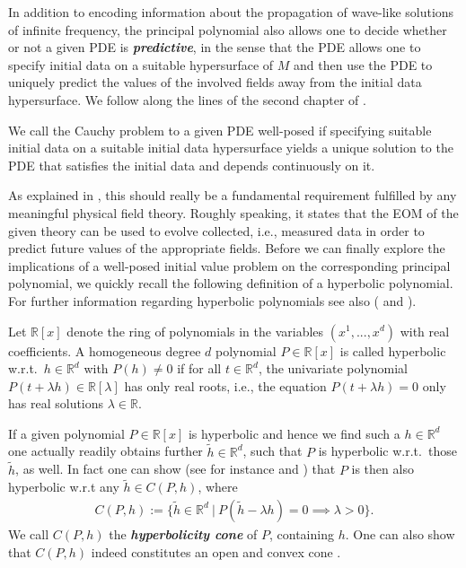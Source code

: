 In addition to encoding information about the propagation of wave-like solutions of infinite frequency, the principal polynomial also allows one to decide whether or not a given PDE is \textit{\textbf{predictive}}, in the sense that the PDE allows one to specify initial data on a suitable hypersurface of $M$ and then use the PDE to uniquely predict the values of the involved fields away from the initial data hypersurface. We follow along the lines of the second chapter of \cite{Rivera}.
\begin{definition}
We call the Cauchy problem to a given PDE well-posed if specifying suitable initial data on a suitable initial data hypersurface yields a unique solution to the PDE that satisfies the initial data and depends continuously on it.  
\end{definition}
As explained in \cite{Rivera}, this should really be a fundamental requirement fulfilled by any meaningful physical field theory. Roughly speaking, it states that the EOM of the given theory can be used to evolve collected, i.e., measured data in order to predict future values of the appropriate fields.
Before we can finally explore the implications of a well-posed initial value problem on the corresponding principal polynomial, we quickly recall the following definition of a hyperbolic polynomial. For further information regarding hyperbolic polynomials see also (\cite{2012arXiv1212.6696K} and \cite{Bauschke98hyperbolicpolynomials}).
\begin{definition}
Let $\mathbb{R}[x]$ denote the ring of polynomials in the variables $(x^1,...,x^d)$ with real coefficients.
A homogeneous degree $d$ polynomial $P \in \mathbb{R}[x]$ is called hyperbolic w.r.t.\ $h\in \mathbb{R}^d$ with $P(h) \neq 0$ if for all $t\in \mathbb{R}^d$, the univariate polynomial
$P(t + \lambda h) \in \mathbb{R}[\lambda]$ has only real roots, i.e.,
the equation $P(t + \lambda h)=0$ only has real solutions $\lambda \in \mathbb{R}$.
\end{definition}
If a given polynomial $P \in \mathbb{R}[x]$ is hyperbolic and hence we find such a $h\in \mathbb{R}^d$ one actually readily obtains further $\tilde{h}\in \mathbb{R}^d$, such that $P$ is hyperbolic w.r.t.\ those $\tilde{h}$, as well. In fact one can show (see for instance \cite{Rivera} and \cite{10.2307/24900665}) that $P$ is then also hyperbolic w.r.t any $\tilde{h} \in C(P,h)$, where 
\begin{align}
    C(P,h) := \{ \tilde{h} \in \mathbb{R}^d \ \vert \ P(\tilde{h}- \lambda h) = 0 \implies \lambda > 0\}.
\end{align}
We call $C(P,h)$ the \textbf{\textit{hyperbolicity cone}} of $P$, containing $h$. One can also show that $C(P,h)$ indeed constitutes an open and convex cone \cite{10.2307/24900665}.

